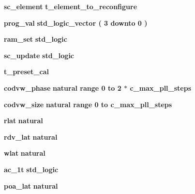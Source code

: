 \begin{DoxyCompactItemize}
\item 
{\bf sc\+\_\+element} {\bfseries {\bfseries {\bfseries {\bf t\+\_\+element\+\_\+to\+\_\+reconfigure}} \textcolor{vhdlchar}{ }}} 
\item 
{\bf prog\+\_\+val} {\bfseries {\bfseries \textcolor{comment}{std\+\_\+logic\+\_\+vector}\textcolor{vhdlchar}{ }\textcolor{vhdlchar}{(}\textcolor{vhdlchar}{ }\textcolor{vhdlchar}{ } \textcolor{vhdldigit}{3} \textcolor{vhdlchar}{ }\textcolor{keywordflow}{downto}\textcolor{vhdlchar}{ }\textcolor{vhdlchar}{ } \textcolor{vhdldigit}{0} \textcolor{vhdlchar}{ }\textcolor{vhdlchar}{)}\textcolor{vhdlchar}{ }}} 
\item 
{\bf ram\+\_\+set} {\bfseries {\bfseries \textcolor{comment}{std\+\_\+logic}\textcolor{vhdlchar}{ }}} 
\item 
{\bf sc\+\_\+update} {\bfseries {\bfseries \textcolor{comment}{std\+\_\+logic}\textcolor{vhdlchar}{ }}} 
\item 
{\bf t\+\_\+preset\+\_\+cal} {\bfseries  }
\item 
{\bf codvw\+\_\+phase} {\bfseries {\bfseries \textcolor{comment}{natural}\textcolor{vhdlchar}{ }\textcolor{vhdlchar}{ }\textcolor{vhdlchar}{ }\textcolor{keywordflow}{range}\textcolor{vhdlchar}{ }\textcolor{vhdlchar}{ } \textcolor{vhdldigit}{0} \textcolor{vhdlchar}{ }\textcolor{keywordflow}{to}\textcolor{vhdlchar}{ }\textcolor{vhdlchar}{ } \textcolor{vhdldigit}{2} \textcolor{vhdlchar}{$\ast$}\textcolor{vhdlchar}{ }\textcolor{vhdlchar}{ }\textcolor{vhdlchar}{ }{\bfseries {\bf c\+\_\+max\+\_\+pll\+\_\+steps}} \textcolor{vhdlchar}{ }}} 
\item 
{\bf codvw\+\_\+size} {\bfseries {\bfseries \textcolor{comment}{natural}\textcolor{vhdlchar}{ }\textcolor{vhdlchar}{ }\textcolor{vhdlchar}{ }\textcolor{keywordflow}{range}\textcolor{vhdlchar}{ }\textcolor{vhdlchar}{ } \textcolor{vhdldigit}{0} \textcolor{vhdlchar}{ }\textcolor{keywordflow}{to}\textcolor{vhdlchar}{ }\textcolor{vhdlchar}{ }\textcolor{vhdlchar}{ }\textcolor{vhdlchar}{ }{\bfseries {\bf c\+\_\+max\+\_\+pll\+\_\+steps}} \textcolor{vhdlchar}{ }}} 
\item 
{\bf rlat} {\bfseries {\bfseries \textcolor{comment}{natural}\textcolor{vhdlchar}{ }}} 
\item 
{\bf rdv\+\_\+lat} {\bfseries {\bfseries \textcolor{comment}{natural}\textcolor{vhdlchar}{ }}} 
\item 
{\bf wlat} {\bfseries {\bfseries \textcolor{comment}{natural}\textcolor{vhdlchar}{ }}} 
\item 
{\bf ac\+\_\+1t} {\bfseries {\bfseries \textcolor{comment}{std\+\_\+logic}\textcolor{vhdlchar}{ }}} 
\item 
{\bf poa\+\_\+lat} {\bfseries {\bfseries \textcolor{comment}{natural}\textcolor{vhdlchar}{ }}} 
\end{DoxyCompactItemize}


